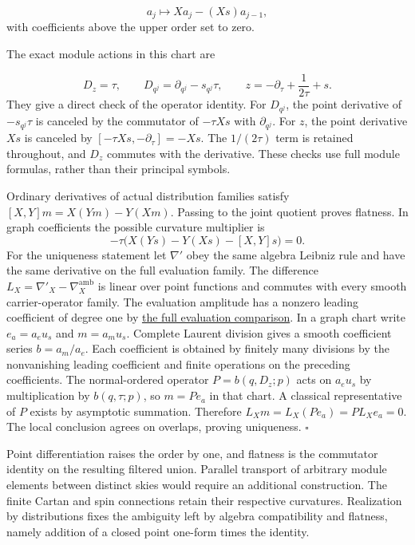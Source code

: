 \documentclass[
  english,
  11pt,
  reqno]{amsart}
\begin{document}
\label{eq:online-ambient-point-coefficient-derivative} \[
a_j\longmapsto Xa_j-(Xs)a_{j-1},
\] with coefficients above the upper order set to zero.

The exact module actions in this chart are

\label{eq:online-ambient-graph-module-generators} \[
D_z=\tau,\qquad
D_{q^j}=\partial_{q^j}-s_{q^j}\tau,
\qquad
z=-\partial_\tau+\frac1{2\tau}+s.
\] They give a direct check of the operator identity. For \(D_{q^j}\),
the point derivative of \(-s_{q^j}\tau\) is canceled by the commutator
of \(-\tau Xs\) with \(\partial_{q^j}\). For \(z\), the point derivative
\(Xs\) is canceled by \([-\tau Xs,-\partial_\tau]=-Xs\). The
\(1/(2\tau)\) term is retained throughout, and \(D_z\) commutes with the
derivative. These checks use full module formulas, rather than their
principal symbols.

Ordinary derivatives of actual distribution families satisfy
\([X,Y]m=X(Ym)-Y(Xm)\). Passing to the joint quotient proves flatness.
In graph coefficients the possible curvature multiplier is \[
-\tau\bigl(X(Ys)-Y(Xs)-[X,Y]s\bigr)=0.
\] For the uniqueness statement let \(\nabla'\) obey the same algebra
Leibniz rule and have the same derivative on the full evaluation family.
The difference \(L_X=\nabla'_X-\nabla_X^{\mathrm{amb}}\) is linear over
point functions and commutes with every smooth carrier-operator family.
The evaluation amplitude has a nonzero leading coefficient of degree one
by \hyperref[prop:online-wave-full-evaluation-comparison]{the full
evaluation comparison}. In a graph chart write \(e_a=a_eu_s\) and
\(m=a_mu_s\). Complete Laurent division gives a smooth coefficient
series \(b=a_m/a_e\). Each coefficient is obtained by finitely many
divisions by the nonvanishing leading coefficient and finite operations
on the preceding coefficients. The normal-ordered operator
\(P=b(q,D_z;p)\) acts on \(a_eu_s\) by multiplication by
\(b(q,\tau;p)\), so \(m=Pe_a\) in that chart. A classical representative
of \(P\) exists by asymptotic summation. Therefore
\(L_Xm=L_X(Pe_a)=P L_Xe_a=0\). The local conclusion agrees on overlaps,
proving uniqueness. \hfill\(\square\)

Point differentiation raises the order by one, and flatness is the
commutator identity on the resulting filtered union. Parallel transport
of arbitrary module elements between distinct skies would require an
additional construction. The finite Cartan and spin connections retain
their respective curvatures. Realization by distributions fixes the
ambiguity left by algebra compatibility and flatness, namely addition of
a closed point one-form times the identity.
\end{document}
